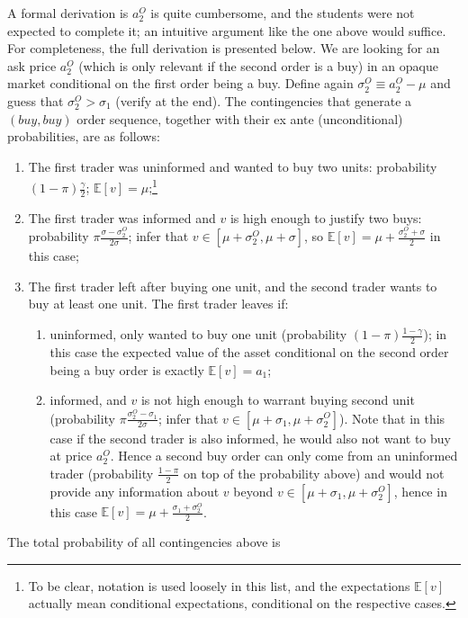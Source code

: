 \documentclass[a4paper]{article}
\begin{document}
\begin{enumerate}
	A formal derivation is $a_2^O$ is quite cumbersome, and the students were not expected to complete it; an intuitive argument like the one above would suffice. For completeness, the full derivation is presented below. We are looking for an ask price $a_2^O$ (which is only relevant if the second order is a buy) in an opaque market conditional on the first order being a buy. Define again $\sigma_2^O \equiv a_2^O - \mu$ and guess that $\sigma_2^O > \sigma_1$ (verify at the end). The contingencies that generate a $(buy,buy)$ order sequence, together with their ex ante (unconditional) probabilities, are as follows:
	\begin{enumerate}
		\item The first trader was uninformed and wanted to buy two units: probability $(1-\pi)\frac{\gamma}{2}$; $\mathbb{E}[v]=\mu$;\footnote{To be clear, notation is used loosely in this list, and the expectations $\mathbb{E}[v]$ actually mean conditional expectations, conditional on the respective cases.}
		\item The first trader was informed and $v$ is high enough to justify two buys: probability $\pi \frac{\sigma - \sigma_2^O}{2\sigma}$; infer that $v \in [\mu+\sigma_2^O, \mu+\sigma]$, so $\mathbb{E}[v] = \mu + \frac{\sigma_2^O + \sigma}{2}$ in this case;
		\item The first trader left after buying one unit, and the second trader wants to buy at least one unit. The first trader leaves if:
		\begin{enumerate}
			\item uninformed, only wanted to buy one unit (probability $(1-\pi)\frac{1-\gamma}{2}$); in this case the expected value of the asset conditional on the second order being a buy order is exactly $\mathbb{E}[v]=a_1$;
			\item informed, and $v$ is not high enough to warrant buying second unit (probability $\pi \frac{\sigma_2^O - \sigma_1}{2\sigma}$; infer that $v \in [\mu+\sigma_1, \mu+\sigma_2^O]$). Note that in this case if the second trader is also informed, he would also not want to buy at price $a_2^O$. Hence a second buy order can only come from an uninformed trader (probability $\frac{1-\pi}{2}$ on top of the probability above) and would not provide any information about $v$ beyond $v \in [\mu+\sigma_1, \mu+\sigma_2^O]$, hence in this case $\mathbb{E}[v] = \mu + \frac{\sigma_1 + \sigma_2^O}{2}$.
		\end{enumerate}
	\end{enumerate}
	The total probability of all contingencies above is 

\end{enumerate}
\end{document}
